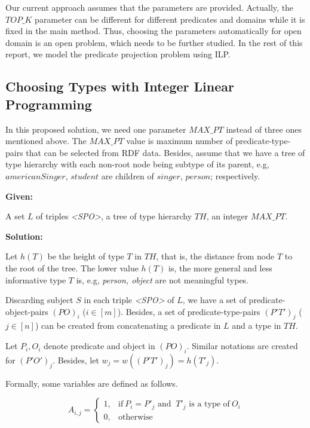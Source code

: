 \documentclass{acm_proc_article-sp}
\begin{document}
Our current approach assumes that the parameters are provided. Actually, the $TOP\_K$ parameter can be different for different predicates and domains while it is fixed in the main method. Thus, choosing the parameters automatically for open domain is an open problem, which needs to be further studied. In the rest of this report, we model the predicate projection problem using ILP.

\subsection{Choosing Types with Integer Linear Programming}

In this proposed solution, we need one parameter $MAX\_PT$ instead of three ones mentioned above. The $MAX\_PT$ value is maximum number of predicate-type-pairs that can be selected from RDF data. Besides, assume that we have a tree of type hierarchy with each non-root node being subtype of its parent, e.g, $americanSinger$, $student$ are children of $singer$, $person$; respectively.

\textbf{Given:}

A set $L$ of triples \textit{<SPO>}, a tree of type hierarchy $TH$, an integer $MAX\_PT$.

\textbf{Solution:}

Let $h(T)$ be the height of type $T$ in $TH$, that is, the distance from node $T$ to the root of the tree. The lower value $h(T)$ is, the more general and less informative type $T$ is, e.g, \textit{person, object} are not meaningful types.

Discarding subject $S$ in each triple \textit{<SPO>} of $L$, we have a set of predicate-object-pairs $(PO)_{i}$ ($i \in [m]$). Besides, a set of predicate-type-pairs $(P'T')_{j}$ ($j \in [n]$) can be created from concatenating a predicate in $L$ and a type in $TH$.

Let $P_{i}, O_{i}$ denote predicate and object in $(PO)_{i}$. Similar notations are created for $(P'O')_{j}$. Besides, let $w_{j} = w((P'T')_{j}) = h(T'_{j})$.

Formally, some variables are defined as follows.

\begin{equation}
    A_{i,j} =
    \begin{cases}
      1, & \text{if}\ P_{i} = P'_{j}  \text{ and }\ T'_{j} \text{ is a type of}\ O_{i}\\
      0, & \text{otherwise}
    \end{cases}
\end{equation}
\end{document}

